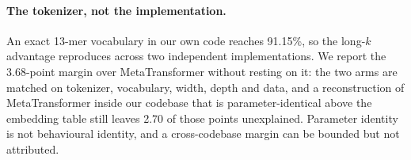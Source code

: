 \begin{table}[htbp]
    \centering
    \small
    \caption{Tokenization arms trained in our own codebase on the same 50M balanced reads, scored on the same held-out 100K test set with RC TTA. MetaTransformer is quoted on the same pool; its 87.47\% here and the 87.42\% of Section~\ref{sec:exp-tokenization} are the same run scored on the common test set and on the 5M validation split respectively.}
    \label{tab:thirteenmer}
\end{table}

\paragraph{The tokenizer, not the implementation.} An exact 13-mer vocabulary in our own code reaches 91.15\%, so the long-$k$ advantage reproduces across two independent implementations. We report the 3.68-point margin over MetaTransformer without resting on it: the two arms are matched on tokenizer, vocabulary, width, depth and data, and a reconstruction of MetaTransformer inside our codebase that is parameter-identical above the embedding table still leaves 2.70 of those points unexplained. Parameter identity is not behavioural identity, and a cross-codebase margin can be bounded but not attributed.

